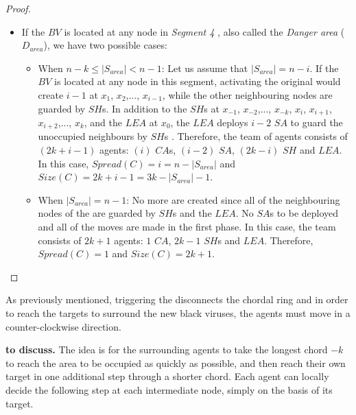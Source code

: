 \begin{proof}
\begin{itemize}
\item If the $BV$ is located at any node in {\em  Segment 4 }, also called  the {\it Danger area} ($D_{area}$), we have two possible cases:

\begin{itemize}
\item When $n-k \leq |S_{area}| < n-1$:
Let us assume that $|S_{area}|=n-i$.
If the $BV$ is located at any node in this segment, activating the original \bv would create $i-1$ \bvs at $x_{1}$, $x_{2}$,..., $x_{i-1}$, while the other neighbouring nodes are guarded by $SH$s. In addition to the $SH$s at $x_{-1}$, $x_{-2}$,..., $x_{-k}$, $x_{i}$, $x_{i+1}$, $x_{i+2}$,..., $x_{k}$, and the $LEA$ at $x_{0}$, the $LEA$ deploys $i-2$  $SA$ to guard the unoccupied neighbours by $SH$s .
Therefore, the team of agents consists of $(2k+i-1)$ agents: $(i)$ $CA$s, $(i-2)$  $SA$, $(2k-i)$ $SH$ and $LEA$. In this case,  $Spread(C)=i=n-|S_{area}|$ and $Size(C)=2k+i-1=3k-|S_{area}|-1$.


\item When $|S_{area}|=n-1$:
No more \bvs are created  since all of the neighbouring nodes of the \bv are guarded by $SH$s and the $LEA$. No $SA$s to be deployed and all of the moves are made in the first phase. 
In this case,  the team consists of $2k+1$ agents: $1$ $CA$, $2k-1$ $SH$s and $LEA$. Therefore,$Spread(C)=1$ and $Size(C)=2k+1$.

\end{itemize}
\end{itemize}
\end{proof}




 
As previously mentioned, triggering the \bv disconnects the chordal ring and in order to reach the targets to surround the new black viruses, the agents must move in a counter-clockwise direction.


{\bf to discuss.}
The idea is for the surrounding agents to take the longest chord $-k$ to reach the area to be occupied as quickly as possible, and then reach their own target in one additional step through a shorter chord. 
Each agent can locally decide the following step  at each intermediate node, simply on the basis of its target.
 
